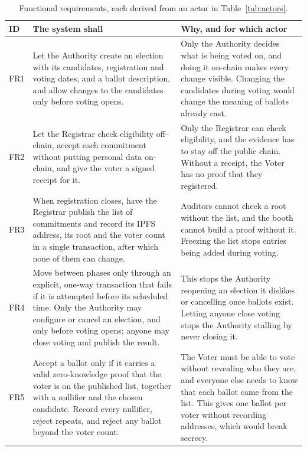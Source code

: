 \begin{longtable}{@{}>{\RaggedRight\arraybackslash\small}p{1.3cm}>{\RaggedRight\arraybackslash\small}p{8.1cm}>{\RaggedRight\arraybackslash\small}p{7.9cm}@{}}
  \caption{Functional requirements, each derived from an actor in Table~\ref{tab:actors}.}\label{tab:fr}\\
  \toprule
  \textbf{ID} & \textbf{The system shall} & \textbf{Why, and for which actor} \\
  \midrule
  \endhead
  \bottomrule
  \endlastfoot
  FR1 & Let the Authority create an election with its candidates, registration and voting dates, and a ballot description, and allow changes to the candidates only before voting opens. & Only the Authority decides what is being voted on, and doing it on-chain makes every change visible. Changing the candidates during voting would change the meaning of ballots already cast. \\
  \addlinespace[2pt]
  FR2 & Let the Registrar check eligibility off-chain, accept each commitment without putting personal data on-chain, and give the voter a signed receipt for it. & Only the Registrar can check eligibility, and the evidence has to stay off the public chain. Without a receipt, the Voter has no proof that they registered. \\
  \addlinespace[2pt]
  FR3 & When registration closes, have the Registrar publish the list of commitments and record its IPFS address, its root and the voter count in a single transaction, after which none of them can change. & Auditors cannot check a root without the list, and the booth cannot build a proof without it. Freezing the list stops entries being added during voting. \\
  \addlinespace[2pt]
  FR4 & Move between phases only through an explicit, one-way transaction that fails if it is attempted before its scheduled time. Only the Authority may configure or cancel an election, and only before voting opens; anyone may close voting and publish the result. & This stops the Authority reopening an election it dislikes or cancelling once ballots exist. Letting anyone close voting stops the Authority stalling by never closing it. \\
  \addlinespace[2pt]
  FR5 & Accept a ballot only if it carries a valid zero-knowledge proof that the voter is on the published list, together with a nullifier and the chosen candidate. Record every nullifier, reject repeats, and reject any ballot beyond the voter count. & The Voter must be able to vote without revealing who they are, and everyone else needs to know that each ballot came from the list. This gives one ballot per voter without recording addresses, which would break secrecy. \\

\end{longtable}

